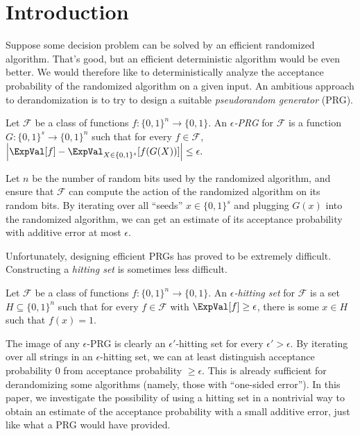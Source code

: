 
%
%
%
	 	
\section{Introduction} \label{sec:intro}
Suppose some decision problem can be solved by an efficient randomized algorithm. That's good, but an efficient deterministic algorithm would be even better. We would therefore like to deterministically analyze the acceptance probability of the randomized algorithm on a given input. An ambitious approach to derandomization is to try to design a suitable \emph{pseudorandom generator} (PRG).
\begin{definition}
Let $\mathcal{F}$ be a class of functions $f \colon \{0, 1\}^n \to \{0, 1\}$. An \emph{$\epsilon$-PRG} for $\mathcal{F}$ is a function $G \colon \{0, 1\}^s \to \{0, 1\}^n$ such that for every $f \in \mathcal{F}$,
$
\left|\ExpVal[f] - \ExpVal_{X \in \{0, 1\}^s}[f(G(X))]\right| \leq \epsilon.
$
\end{definition}
Let $n$ be the number of random bits used by the randomized algorithm, and ensure that $\mathcal{F}$ can compute the action of the randomized algorithm on its random bits. By iterating over all ``seeds'' $x \in \{0, 1\}^s$ and plugging $G(x)$ into the randomized algorithm, we can get an estimate of its acceptance probability with additive error at most $\epsilon$.

Unfortunately, designing efficient PRGs has proved to be extremely difficult. Constructing a \emph{hitting set} is sometimes less difficult.
\begin{definition}
Let $\mathcal{F}$ be a class of functions $f \colon \{0, 1\}^n \to \{0, 1\}$. An \emph{$\epsilon$-hitting set} for $\mathcal{F}$ is a set $H \subseteq \{0, 1\}^n$ such that for every $f \in \mathcal{F}$ with $\ExpVal[f] \geq \epsilon$, there is some $x \in H$ such that $f(x) = 1$.
\end{definition}
The image of any $\epsilon$-PRG is clearly an $\epsilon'$-hitting set for every $\epsilon' > \epsilon$. By iterating over all strings in an $\epsilon$-hitting set, we can at least distinguish acceptance probability $0$ from acceptance probability $\geq \epsilon$. This is already sufficient for derandomizing some algorithms (namely, those with ``one-sided error''). In this paper, we investigate the possibility of using a hitting set in a nontrivial way to obtain an estimate of the acceptance probability with a small additive error, just like what a PRG would have provided.

